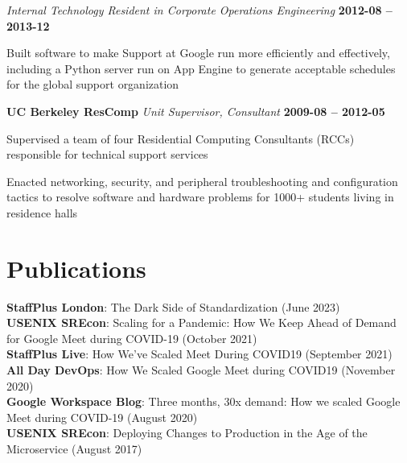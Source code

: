 \documentclass[margin,line]{resume}
\begin{document}
\begin{resume}
  \textsl{Internal Technology Resident in Corporate Operations Engineering} \hfill \textbf{2012-08 -- 2013-12}
  \begin{list2}
    \item Built software to make Support at Google run more efficiently and effectively, including a Python server run on App Engine to generate acceptable schedules for the global support organization
  \end{list2}\vspace{-1.5mm}

  \textbf{UC Berkeley ResComp} \vspace{1mm}\vspace{0mm}%
  \textsl{Unit Supervisor, Consultant} \hfill \textbf{2009-08 -- 2012-05}
  \begin{list2}
    \item Supervised a team of four Residential Computing Consultants (RCCs) responsible for technical support services
    \item Enacted networking, security, and peripheral troubleshooting and configuration tactics to resolve software and
    hardware problems for 1000+ students living in residence halls
  \end{list2}\vspace{-1.5mm}

  \section{\mysidestyle Publications}
  \textbf{StaffPlus London}: The Dark Side of Standardization (June 2023)
  \\\textbf{USENIX SREcon}: Scaling for a Pandemic: How We Keep Ahead of Demand for Google Meet during COVID-19 (October 2021)
  \\\textbf{StaffPlus Live}: How We've Scaled Meet During COVID19 (September 2021)
  \\\textbf{All Day DevOps}: How We Scaled Google Meet during COVID19 (November 2020)
  \\\textbf{Google Workspace Blog}: Three months, 30x demand: How we scaled Google Meet during COVID-19 (August 2020)
  \\\textbf{USENIX SREcon}: Deploying Changes to Production in the Age of the Microservice (August 2017)


\end{resume}
\end{document}
